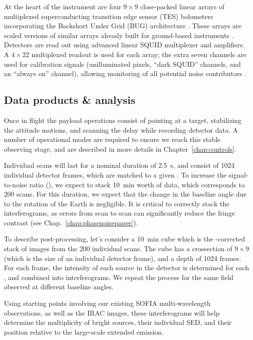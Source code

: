 At the heart of the instrument are four $9\times 9$ close-packed linear arrays of multiplexed superconducting transition edge sensor (TES) bolometers \citep{Benford:2008wk} incorporating the Backshort Under Grid (BUG) architecture \citep{Allen:2006jn}. These arrays are scaled versions of similar arrays already built for ground-based instruments \citep[e.g., GISMO,][]{Staguhn:2014jg}. Detectors are read out using advanced linear SQUID multiplexer and amplifiers. A $4\times 22$ multiplexed readout is used for each array; the extra seven channels are used for calibration signals (unilluminated pixels, “dark SQUID” channels, and an “always on” channel), allowing monitoring of all potential noise contributors \citep{deKorte:2003km}.  






\subsection{Data products \& analysis}


Once in flight the payload operations consist of pointing at a target, stabilizing the attitude motions, and scanning the delay while recording detector data. A number of operational modes are required to ensure we reach this stable observing stage, and are described in more details in Chapter~\ref{chap:controls}. 

Individual scans will last for a nominal duration of \SI{2.5}{\second}, and consist of \si{1024} individual detector frames, which are matched to a given \OPD. To increase the signal-to-noise ratio (\SNR), we expect to stack \SI{10}{\minute} worth of data, which corresponds to 200 scans. For this duration, we expect that the change in the baseline angle due to the rotation of the Earth is negligible. It is critical to correctly stack the interferograms, as \OPD errors from scan to scan can significantly reduce the fringe contrast (see Chap.~\ref{chap:phasenoisepaper}).

To describe post-processing, let's consider a \SI{10}{\minute} cube which is the {\OPD}-corrected stack of images from the 200 individual scans. The cube has a crossection of $9\times 9$ (which is the size of an individual detector frame), and a depth of 1024 frames. For each frame, the intensity of each source in the detector is determined for each \OPD, and combined into interferograms. We repeat the process for the same field observed at different baseline angles. 

Using starting points involving our existing SOFIA multi-wavelength observations, as well as the IRAC images, these interferograms will help determine the multiplicity of bright sources, their individual SED, and their position relative to the large-scale extended emission. 

